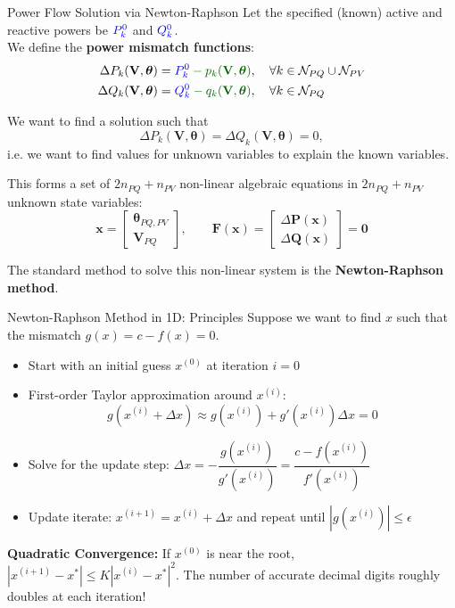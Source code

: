 \begin{frame}[allowframebreaks]{Power Flow Solution via Newton-Raphson}
    Let the specified (known) active and reactive powers be $\mathcolor{blue}{P_k^0}$ and $\mathcolor{blue}{Q_k^0}$. \\
    We define the \textbf{power mismatch functions}:
    \begin{align*}
        \Delta P_k(\mathbf{V}, \boldsymbol{\theta}) &= \mathcolor{blue}{P_k^0} \mathcolor[RGB]{00,99,00}{- p_k(\mathbf{V}, \boldsymbol{\theta})}, \quad \forall k \in \mathcal{N}_{PQ} \cup \mathcal{N}_{PV} \\
        \Delta Q_k(\mathbf{V}, \boldsymbol{\theta}) &= \mathcolor{blue}{Q_k^0} \mathcolor[RGB]{00,99,00}{- q_k(\mathbf{V}, \boldsymbol{\theta})}, \quad \forall k \in \mathcal{N}_{PQ}
    \end{align*}

    We want to find a solution such that $$\Delta P_k(\mathbf{V}, \boldsymbol{\theta}) = \Delta Q_k(\mathbf{V}, \boldsymbol{\theta}) = 0,$$
    i.e. we want to find values for unknown variables to explain the known variables.
    
    This forms a set of $2 n_{PQ} + n_{PV}$ non-linear algebraic equations in $2 n_{PQ} + n_{PV}$ unknown state variables:
    $$\mathbf{x} = \begin{bmatrix} \boldsymbol{\theta}_{PQ, PV} \\ \mathbf{V}_{PQ} \end{bmatrix}, \qquad \mathbf{F}(\mathbf{x}) = \begin{bmatrix} \Delta \mathbf{P}(\mathbf{x}) \\ \Delta \mathbf{Q}(\mathbf{x}) \end{bmatrix} = \mathbf{0}$$
    
    The standard method to solve this non-linear system is the \textbf{Newton-Raphson method}.
\end{frame}

\begin{frame}{Newton-Raphson Method in 1D: Principles}
    Suppose we want to find $x$ such that the mismatch $g(x) = c - f(x) = 0$.
    
    \begin{itemize}
        \item Start with an initial guess $x^{(0)}$ at iteration $i=0$
        \item First-order Taylor approximation around $x^{(i)}$:
        $$g(x^{(i)} + \Delta x) \approx g(x^{(i)}) + g'(x^{(i)}) \Delta x = 0$$
        \item Solve for the update step: $\Delta x = -\dfrac{g(x^{(i)})}{g'(x^{(i)})} = \dfrac{c - f(x^{(i)})}{f'(x^{(i)})}$
        \item Update iterate: $x^{(i+1)} = x^{(i)} + \Delta x$ and repeat until $|g(x^{(i)})| \le \epsilon$
    \end{itemize}
    
    \vspace{0.15cm}
    \alert{\textbf{Quadratic Convergence:}} If $x^{(0)}$ is near the root, $|x^{(i+1)} - x^*| \le K |x^{(i)} - x^*|^2$.
    The number of accurate decimal digits roughly doubles at each iteration!
\end{frame}

